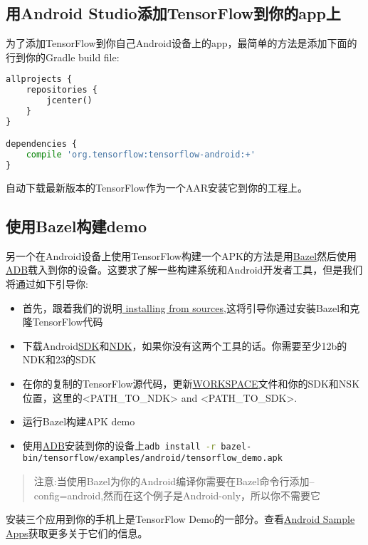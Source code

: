 \subsection{用Android Studio添加TensorFlow到你的app上}
为了添加TensorFlow到你自己Android设备上的app，最简单的方法是添加下面的行到你的Gradle build file:
\begin{lstlisting}[language=Python]
allprojects {
    repositories {
        jcenter()
    }
}

dependencies {
    compile 'org.tensorflow:tensorflow-android:+'
}

\end{lstlisting}
自动下载最新版本的TensorFlow作为一个AAR安装它到你的工程上。
\subsection{使用Bazel构建demo}\label{subseq:Bazel构建}
另一个在Android设备上使用TensorFlow构建一个APK的方法是用\href{https://bazel.build/}{Bazel}然后使用\href{https://developer.android.com/studio/command-line/adb.html?hl=zh-cn}{ADB}载入到你的设备。这要求了解一些构建系统和Android开发者工具，但是我们将通过如下引导你:
\begin{itemize}
\item 首先，跟着我们的说明\href{https://www.tensorflow.org/install/install_sources?hl=zh-cn}{ installing from sources},这将引导你通过安装Bazel和克隆TensorFlow代码
\item 下载Android\href{https://developer.android.com/studio/index.html?hl=zh-cn}{SDK}和\href{https://developer.android.com/ndk/downloads/index.html?hl=zh-cn}{NDK}，如果你没有这两个工具的话。你需要至少12b的NDK和23的SDK
\item 在你的复制的TensorFlow源代码，更新\href{https://github.com/tensorflow/tensorflow/blob/master/WORKSPACE}{WORKSPACE}文件和你的SDK和NSK位置，这里的<PATH\_TO\_NDK> and <PATH\_TO\_SDK>.
\item 运行Bazel构建APK demo 
\item 使用\href{https://developer.android.com/studio/command-line/adb.html?hl=zh-cn#move}{ADB}安装到你的设备上\lstinline[language=Bash]{adb install -r bazel-bin/tensorflow/examples/android/tensorflow_demo.apk}
\end{itemize}
\begin{quote}
注意:当使用Bazel为你的Android编译你需要在Bazel命令行添加--config=android,然而在这个例子是Android-only，所以你不需要它
\end{quote}
安装三个应用到你的手机上是TensorFlow Demo的一部分。查看\href{https://www.tensorflow.org/mobile/android_build?hl=zh-cn#android_sample_apps}{Android Sample Apps}获取更多关于它们的信息。
